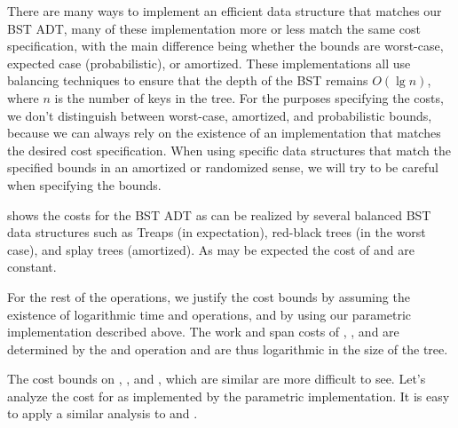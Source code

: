 There are many ways to implement an efficient data structure that
matches our BST ADT, many of these implementation more or less match
the same cost specification, with the main difference being whether
the bounds are worst-case, expected case (probabilistic), or
amortized.  
%
These implementations all use balancing techniques to ensure that the
depth of the BST remains $O(\lg{n})$, where $n$ is the number of keys
in the tree.  
%
For the purposes specifying the costs, we don't distinguish between
worst-case, amortized, and probabilistic bounds, because we can always
rely on the existence of an implementation that matches the desired
cost specification.  
%
When using specific data structures that match the specified bounds in
an amortized or randomized sense, we will try to be careful when
specifying the bounds.




 shows the costs for the BST ADT as can be
realized by several balanced BST data structures such as Treaps (in
expectation), red-black trees (in the worst case), and splay trees
(amortized). As may be expected the cost of  and
 are constant.
%

For the rest of the operations, we justify the cost bounds by assuming
the existence of logarithmic time  and  operations,
and by using our parametric implementation described above.
%
The work and span costs of , , and
 are determined by the  and 
operation and are thus logarithmic in the size of the tree.
%

The cost bounds on , , and
, which are similar are more difficult to see.  Let's
analyze the cost for  as implemented by the parametric
implementation. It is easy to apply a similar analysis to
 and .

